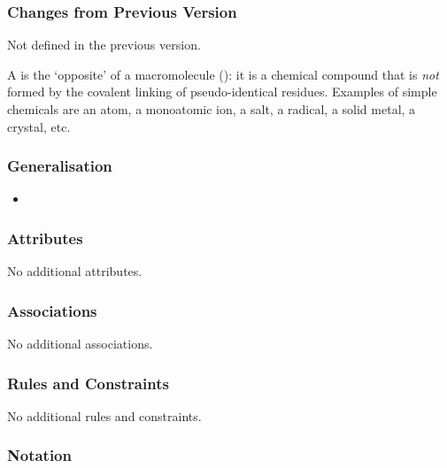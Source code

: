 
\subsubsection{Changes from Previous Version}

Not defined in the previous version.

\label{sec:techref:simpleChemical}

A  is the `opposite' of a macromolecule
(): it is a chemical compound that is \emph{not}
formed by the covalent linking of pseudo-identical residues.  Examples
of simple chemicals are an atom, a monoatomic ion, a salt, a radical,
a solid metal, a crystal, etc.

\subsubsection{Generalisation}

\begin{itemize}
\item {}
\end{itemize}

\subsubsection{Attributes}

No additional attributes.

\subsubsection{Associations}

No additional associations.

\subsubsection{Rules and Constraints}

No additional rules and constraints.

\subsubsection{Notation}

